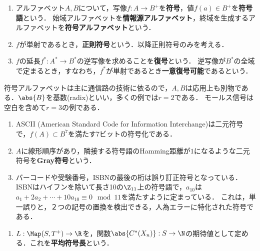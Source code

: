 \documentclass[uplatex,dvipdfmx]{jsreport}
\begin{document}
\begin{definition}\mbox{}
    \begin{enumerate}
        \item アルファベット$A,B$について，写像$f:A\to B^+$を\textbf{符号}，値$f(a)\in B^+$を\textbf{符号語}という．
        始域アルファベットを\textbf{情報源アルファベット}，終域を生成するアルファベットを\textbf{符号アルファベット}という．
        \item $f$が単射であるとき，\textbf{正則符号}という．以降正則符号のみを考える．
        \item $f$の延長$f^*:A^*\to B^*$の逆写像を求めることを\textbf{復号}という．
        逆写像が$B^*$の全域で定まるとき，すなわち，$f^*$が単射であるとき\textbf{一意復号可能}であるという．
    \end{enumerate}
\end{definition}
\begin{remark}
    符号アルファベットは主に通信路の技術に依るので，$A,B$は応用上も別物である．$\abs{B}$を基数(radix)といい，多くの例では$r=2$である．
    モールス信号は空白を含めて$r=3$の例である．
\end{remark}
\begin{example}\mbox{}
    \begin{enumerate}
        \item ASCII (American Standard Code for Information Interchange)は二元符号で，$f(A)\subset B^7$を満たす7ビットの符号化である．
        \item $A$に線形順序があり，隣接する符号語のHamming距離が$1$になるような二元符号を\textbf{Gray符号}という．
        \item バーコードや受験番号，ISBNの最後の桁は誤り訂正符号となっている．
        ISBNはハイフンを除いて長さ10の$\Z_{11}$上の符号語で，$a_10$は$a_1+2a_2+\cdots+10a_{10}\equiv 0\mod 11$を満たすように定まっている．
        これは，単一誤りと，２つの記号の置換を検出できる，人為エラーに特化された符号である．
    \end{enumerate}
\end{example}

\begin{definition}\mbox{}
    \begin{enumerate}
        \item $L:\Map(S,T^+)\to\R$を，関数$\abs{C^*(X_n)}:S\to\N$の期待値として定める．これを\textbf{平均符号長}という．
    \end{enumerate}
\end{definition}
\end{document}
